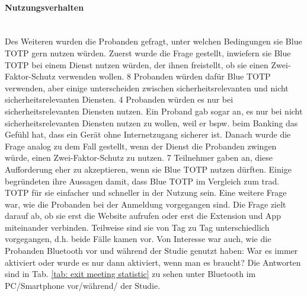 \paragraph*{Nutzungsverhalten}
\mbox{} \vspace{0.1cm} \\
Des Weiteren wurden die Probanden gefragt, unter welchen Bedingungen sie Blue TOTP 
gern nutzen würden. Zuerst wurde die Frage gestellt, inwiefern sie Blue TOTP bei 
einem Dienst nutzen würden, der ihnen freistellt, ob sie einen Zwei-Faktor-Schutz 
verwenden wollen. 8 Probanden würden dafür Blue TOTP verwenden, aber einige 
unterscheiden zwischen sicherheitsrelevanten und nicht sicherheitsrelevanten 
Diensten. 4 Probanden würden es nur bei sicherheitsrelevanten Diensten nutzen. Ein 
Proband gab sogar an, es nur bei nicht sicherheitsrelevanten Diensten nutzen zu 
wollen, weil er bspw. beim Banking das Gefühl hat, dass ein Gerät ohne 
Internetzugang sicherer ist. Danach wurde die Frage analog zu dem Fall gestellt, 
wenn der Dienst die Probanden zwingen würde, einen Zwei-Faktor-Schutz zu nutzen. 7 
Teilnehmer gaben an, diese Aufforderung eher zu akzeptieren, wenn sie Blue TOTP 
nutzen dürften. Einige begründeten ihre Aussagen damit, dass Blue TOTP im Vergleich 
zum trad. TOTP für sie einfacher und schneller in der Nutzung sein. Eine weitere 
Frage war, wie die Probanden bei der Anmeldung vorgegangen sind. Die Frage zielt darauf ab, 
ob sie erst die Website aufrufen oder erst die Extension und App miteinander verbinden. 
Teilweise sind sie von Tag zu Tag unterschiedlich vorgegangen, d.h. beide Fälle kamen vor. Von 
Interesse war auch, wie die Probanden Bluetooth vor und während der Studie genutzt 
haben: War es immer aktiviert oder wurde es nur dann aktiviert, wenn man es braucht? 
Die Antworten sind in Tab. \ref{tab: exit meeting statistic} zu sehen unter \glqq 
Bluetooth im PC/Smartphone vor/während/ der Studie\grqq{}.
